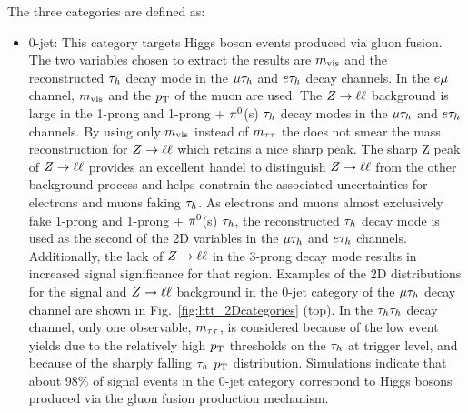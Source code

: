 The three categories are defined as:
\begin{itemize}
\item {0-jet}: This category targets Higgs boson events produced via gluon fusion.
The two variables chosen to extract the results are $m_\text{vis}$ and
the reconstructed $\tau_{h}$ decay mode in the $\mu\tau_{h}$ and $e\tau_{h}$ decay channels.
In the $e\mu$ channel, $m_\text{vis}$ and the $p_\mathrm{T}$ of the muon are used. The $Z\to\ell\ell$ background 
is large in the 1-prong and 1-prong + $\pi^{0}$(s) $\tau_{h}$ decay modes in the
$\mu\tau_{h}$ and $e\tau_{h}$ channels. By using only $m_\text{vis}$ instead of $m_{\tau\tau}$ the \etvecmiss
does not smear the mass reconstruction for $Z\to\ell\ell$ which retains a nice sharp peak.
The sharp Z peak of $Z\to\ell\ell$ provides 
an excellent handel to distinguish $Z\to\ell\ell$ from the other background process and
helps constrain the associated uncertainties for electrons and muons faking $\tau_{h}$.
As electrons and muons almost exclusively fake 1-prong and 1-prong + $\pi^{0}$(s) $\tau_{h}$,
the reconstructed $\tau_{h}$ decay mode is used as the second of the 2D variables in the
$\mu\tau_{h}$ and $e\tau_{h}$ channels. Additionally, the lack of $Z\to\ell\ell$ in the
3-prong decay mode results in increased signal significance for that region.
Examples of the 2D distributions for the signal and $Z\to\ell\ell$ background
in the 0-jet category of the $\mu\tau_{h}$ decay channel are shown in Fig.~\ref{fig:htt_2Dcategories} (top).
In the $\tau_{h}\tau_{h}$ decay channel, only one observable, $m_{\tau\tau}$, is considered because of the low
event yields due to the relatively high $p_\mathrm{T}$ thresholds on the $\tau_{h}$ at trigger level, and 
because of the sharply falling $\tau_{h}$ $p_\mathrm{T}$ distribution. Simulations indicate that about 98\% 
of signal events in the 0-jet category correspond to Higgs bosons produced via the gluon 
fusion production mechanism.


\end{itemize}
